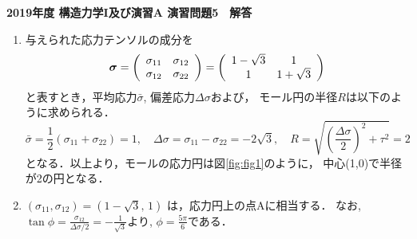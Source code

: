 \documentclass[10pt,a4j]{jarticle}
\newlength{\minitwocolumn}
\begin{document}
\newcommand{\fat}[1]{\mbox{\boldmath $#1$}}
\newcommand{\D}{\partial}
\newcommand{\w}{\omega}
\newcommand{\ga}{\alpha}
\newcommand{\gb}{\beta}
\newcommand{\gx}{\xi}
\newcommand{\gz}{\zeta}
\newcommand{\vhat}[1]{\hat{\fat{#1}}}
\newcommand{\spc}{\vspace{0.7\baselineskip}}
\newcommand{\halfspc}{\vspace{0.3\baselineskip}}

\pagestyle{empty}
\newcommand{\twofig}[2]
 {
   \begin{figure}[h]
     \begin{minipage}[t]{\minitwocolumn}
         \begin{center}   #1
         \end{center}
     \end{minipage}
         \hspace{\columnsep}
     \begin{minipage}[t]{\minitwocolumn}
         \begin{center} #2
         \end{center}
     \end{minipage}
   \end{figure}
 }
\begin{center}
{\Large \bf 2019年度 構造力学I及び演習A 演習問題5　解答} \\
\end{center}
\vspace{15mm}
\begin{enumerate}
\item
与えられた応力テンソルの成分を
\begin{equation}
	\fat{\sigma}
	=
	\left( 
		\begin{array}{cc}
		\sigma_{11} & \sigma_{12} \\
		\sigma_{12} & \sigma_{22} 
		\end{array}
	\right)
	=
	\left( 
		\begin{array}{cc}
			1-\sqrt{3} & 1\\
			1 & 1+\sqrt{3} 
		\end{array}
	\right)
	\label{eqn:sigma_given}
\end{equation}
と表すとき，平均応力$\bar{\sigma}$, 偏差応力$\Delta \sigma$および，
モール円の半径$R$は以下のように求められる．
\begin{equation}
	\bar{\sigma} 
	= \frac{1}{2}\left({ \sigma_{11} + \sigma_{22} }\right) = 1,
	\quad
	\Delta \sigma = \sigma_{11} - \sigma_{22} = -2\sqrt{3},
	\quad
	R = \sqrt{\left({ \frac{\Delta \sigma}{2} }\right)^2 + \tau^2 } 
	=2 
\end{equation}
となる．以上より，モールの応力円は図\ref{fig:fig1}のように，
中心(1,0)で半径が2の円となる．
\item
	$\left(\sigma_{11}, \sigma_{12}\right)=\left(1-\sqrt{3}, \, 1 \right)$
は，応力円上の点Aに相当する．
		なお,$\tan \phi = \frac{\sigma_{12}}{\Delta \sigma/2}=-\frac{1}{\sqrt{3}}$より, 
$\phi=\frac{5\pi}{6}$である．
\end{enumerate}
\end{document}
